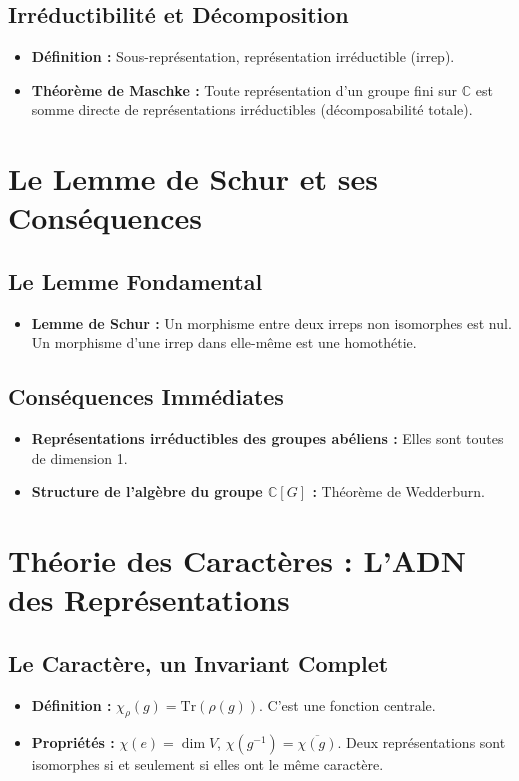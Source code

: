 \documentclass[12pt, a4paper, parskip=full]{report}
\theoremstyle{agregstyle}
\begin{document}
\subsection{Irréductibilité et Décomposition}
\begin{itemize}
    \item \textbf{Définition :} Sous-représentation, représentation irréductible (irrep).
    \item \textbf{Théorème de Maschke :} Toute représentation d'un groupe fini sur $\mathbb{C}$ est somme directe de représentations irréductibles (décomposabilité totale).
\end{itemize}

\section{Le Lemme de Schur et ses Conséquences}
\subsection{Le Lemme Fondamental}
\begin{itemize}
    \item \textbf{Lemme de Schur :} Un morphisme entre deux irreps non isomorphes est nul. Un morphisme d'une irrep dans elle-même est une homothétie.
\end{itemize}
\subsection{Conséquences Immédiates}
\begin{itemize}
    \item \textbf{Représentations irréductibles des groupes abéliens :} Elles sont toutes de dimension 1.
    \item \textbf{Structure de l'algèbre du groupe $\mathbb{C}[G]$ :} Théorème de Wedderburn.
\end{itemize}

\section{Théorie des Caractères : L'ADN des Représentations}
\subsection{Le Caractère, un Invariant Complet}
\begin{itemize}
    \item \textbf{Définition :} $\chi_\rho(g) = \mathrm{Tr}(\rho(g))$. C'est une fonction centrale.
    \item \textbf{Propriétés :} $\chi(e)=\dim V$, $\chi(g^{-1})=\overline{\chi(g)}$. Deux représentations sont isomorphes si et seulement si elles ont le même caractère.
\end{itemize}
\end{document}

